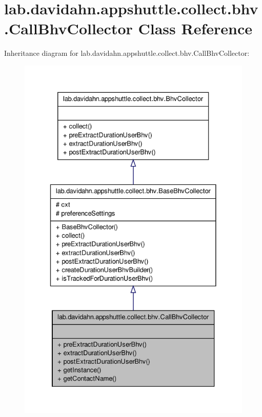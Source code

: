 \hypertarget{classlab_1_1davidahn_1_1appshuttle_1_1collect_1_1bhv_1_1_call_bhv_collector}{\section{lab.\-davidahn.\-appshuttle.\-collect.\-bhv.\-Call\-Bhv\-Collector \-Class \-Reference}
\label{classlab_1_1davidahn_1_1appshuttle_1_1collect_1_1bhv_1_1_call_bhv_collector}
}


\-Inheritance diagram for lab.\-davidahn.\-appshuttle.\-collect.\-bhv.\-Call\-Bhv\-Collector\-:
\nopagebreak
\begin{figure}[H]
\begin{center}
\leavevmode
\includegraphics[width=330pt]{classlab_1_1davidahn_1_1appshuttle_1_1collect_1_1bhv_1_1_call_bhv_collector__inherit__graph}
\end{center}
\end{figure}


